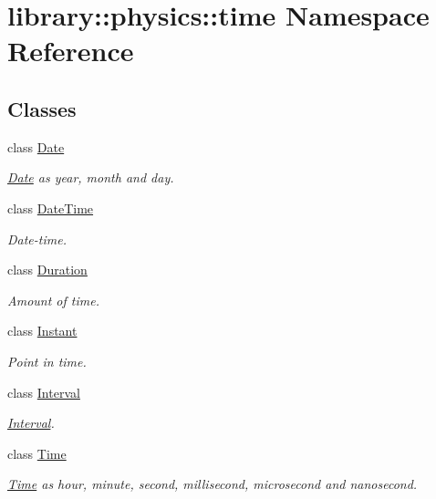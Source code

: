 \hypertarget{namespacelibrary_1_1physics_1_1time}{}\section{library\+:\+:physics\+:\+:time Namespace Reference}
\label{namespacelibrary_1_1physics_1_1time}
\subsection*{Classes}
\begin{DoxyCompactItemize}
\item 
class \hyperlink{classlibrary_1_1physics_1_1time_1_1_date}{Date}
\begin{DoxyCompactList}\small\item\em \hyperlink{classlibrary_1_1physics_1_1time_1_1_date}{Date} as year, month and day. \end{DoxyCompactList}\item 
class \hyperlink{classlibrary_1_1physics_1_1time_1_1_date_time}{Date\+Time}
\begin{DoxyCompactList}\small\item\em Date-\/time. \end{DoxyCompactList}\item 
class \hyperlink{classlibrary_1_1physics_1_1time_1_1_duration}{Duration}
\begin{DoxyCompactList}\small\item\em Amount of time. \end{DoxyCompactList}\item 
class \hyperlink{classlibrary_1_1physics_1_1time_1_1_instant}{Instant}
\begin{DoxyCompactList}\small\item\em Point in time. \end{DoxyCompactList}\item 
class \hyperlink{classlibrary_1_1physics_1_1time_1_1_interval}{Interval}
\begin{DoxyCompactList}\small\item\em \hyperlink{classlibrary_1_1physics_1_1time_1_1_interval}{Interval}. \end{DoxyCompactList}\item 
class \hyperlink{classlibrary_1_1physics_1_1time_1_1_time}{Time}
\begin{DoxyCompactList}\small\item\em \hyperlink{classlibrary_1_1physics_1_1time_1_1_time}{Time} as hour, minute, second, millisecond, microsecond and nanosecond. \end{DoxyCompactList}\end{DoxyCompactItemize}
